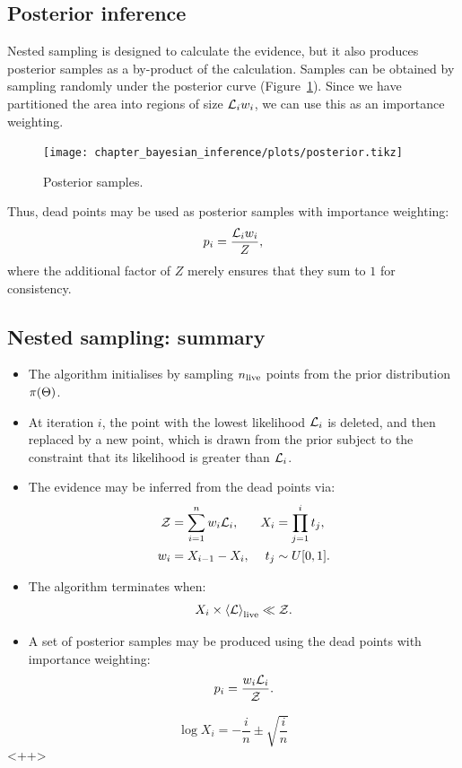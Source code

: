 \subsection{Posterior inference}
Nested sampling is designed to calculate the evidence, but it also produces posterior samples as a by-product of the calculation. Samples can be obtained by sampling randomly under the posterior curve (Figure~\ref{fig:bay:posterior}). Since we have partitioned the area into regions of size $\mathcal{L}_i w_i$, we can use this as an importance weighting.

\begin{figure}[tbp]
  \centering
  \texttt{[image: chapter\_bayesian\_inference/plots/posterior.tikz]}
  \caption{%
    Posterior samples.\label{fig:bay:posterior}
}
\end{figure}

Thus, dead points may be used as posterior samples with importance weighting:
\begin{equation}
  p_i = \frac{\mathcal{L}_i w_i}{Z},
  \label{eqn:bay:posterior_weight}
\end{equation}
where the additional factor of $Z$ merely ensures that they sum to $1$ for consistency.



\subsection{Nested sampling: summary}
\label{sec:bay:comp_space}
\begin{itemize}
  \item The algorithm initialises by sampling $n_{\mathrm{live}}$ points from the prior distribution $\pi(\Theta)$. 
  \item At iteration $i$, the point with the lowest likelihood $\mathcal{L}_i$ is deleted, and then replaced by a new point, which is drawn from the prior subject to the constraint that its likelihood is greater than $\mathcal{L}_i$. 
  \item The evidence may be inferred from the dead points via:
    \begin{align}
      \mathcal{Z} &= \sum_{i=1}^n w_i \mathcal{L}_i, &
      X_i &= \prod_{j=1}^{i} t_j, \nonumber \\
      w_i &= X_{i-1}-X_{i},  & 
      t_j &\sim U[0,1].\nonumber 
    \end{align}
  \item The algorithm terminates when:
    \begin{equation}
      X_i \times {\left\langle{\mathcal{L}}\right\rangle}_{\mathrm{live}} \ll \mathcal{Z}.
    \end{equation}
  \item A set of posterior samples may be produced using the dead points with importance weighting:
    \begin{equation}
      p_i = \frac{w_i\mathcal{L}_i}{\mathcal{Z}}.\nonumber
    \end{equation}

\end{itemize}

\begin{equation}
  \log X_i = -\frac{i}{n} \pm \sqrt{\frac{i}{n}}
  \label{eqn:pc:X_full}
\end{equation}<++>




